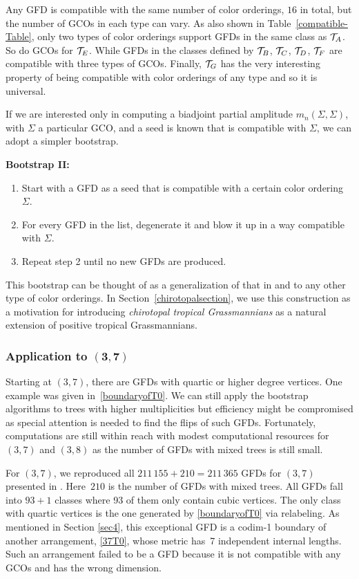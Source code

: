 \documentclass[pdftex]{sigma}
\theoremstyle{definition}
\numberwithin{equation}{section}
\begin{document}
Any GFD is compatible with the same number of color orderings, $16$ in total, but the number of GCOs in each type can vary. As also shown in Table~\ref{compatible-Table}, only two types of color orderings support GFDs in the same class as ${\cal T}_A$. So do GCOs for ${\cal T}_E$. While GFDs in the classes defined by ${\cal T}_B$, ${\cal T}_C$, ${\cal T}_D$, ${\cal T}_F$ are compatible with three types of GCOs. Finally, ${\cal T}_G$ has the very interesting property of being compatible with color orderings of any type and so it is universal.

If we are interested only in computing a biadjoint partial amplitude $m_n(\Sigma,\Sigma)$, with $\Sigma$ a particular GCO, and a seed is known that is compatible with $\Sigma$, we can adopt a simpler bootstrap.

{\bf Bootstrap II:}
\begin{enumerate}\itemsep=0pt
\item[(1)] Start with a GFD as a seed that is compatible with a certain color ordering $\Sigma$.
 \item[(2)] For every GFD in the list, degenerate it and blow it up in a way compatible with $\Sigma$.
\item[(3)] Repeat step 2 until no new GFDs are produced.
\end{enumerate}

 This bootstrap can be thought of as a generalization of that in \cite{Borges:2019csl} and \cite{Cachazo:2019xjx} to any other type of color orderings.
In Section~\ref{chirotopalsection}, we use this construction as a motivation for introducing {\it chirotopal tropical Grassmannians} as a natural extension of positive tropical Grassmannians.

\subsubsection[Application to (3,7)]{Application to $\boldsymbol{(3,7)}$}

Starting at $(3,7)$, there are GFDs with quartic or higher degree vertices. One example was given in~\eqref{boundaryofT0}. We can still apply the bootstrap algorithms to trees with higher multiplicities but efficiency might be compromised as special attention is needed to find the flips of such GFDs. Fortunately, computations are still within reach with modest computational resources for $(3,7)$ and $(3,8)$ as the number of GFDs with mixed trees is still small.

For $(3,7)$, we reproduced all $211\,155+210 = 211\,365$ GFDs for $(3,7)$ presented in \cite{herrmann2008draw}. Here~$210$ is the number of GFDs with mixed trees. All GFDs fall into $93+1$ classes where 93 of them only contain cubic vertices. The only class with quartic vertices is the one generated by \eqref{boundaryofT0} via relabeling. As mentioned in Section \ref{sec4}, this exceptional GFD is a codim-1 boundary of another arrangement, \eqref{37T0}, whose metric has~7 independent internal lengths. Such an arrangement failed to be a GFD because it is not compatible with any GCOs and has the wrong dimension.
\end{document}
